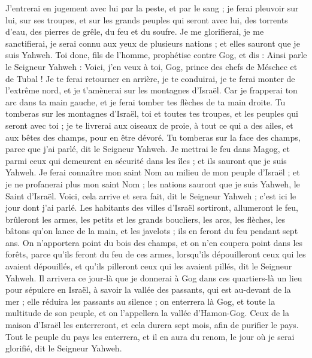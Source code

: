 \begin{multicols}{2}
J'entrerai en jugement avec lui par la peste, et par le sang ; je ferai pleuvoir sur lui, sur ses troupes, et sur les grands peuples qui seront avec lui, des torrents d'eau, des pierres de grêle, du feu et du soufre.
Je me glorifierai, je me sanctifierai, je serai connu aux yeux de plusieurs nations ; et elles sauront que je suis Yahweh.
\VerseOne{}Toi donc, fils de l’homme, prophétise contre Gog, et dis : Ainsi parle le Seigneur Yahweh : Voici, j'en veux à toi, Gog, prince des chefs de Méschec et de Tubal !
Je te ferai retourner en arrière, je te conduirai, je te ferai monter de l’extrême nord, et je t’amènerai sur les montagnes d’Israël.
Car je frapperai ton arc dans ta main gauche, et je ferai tomber tes flèches de ta main droite.
Tu tomberas sur les montagnes d'Israël, toi et toutes tes troupes, et les peuples qui seront avec toi ; je te livrerai aux oiseaux de proie, à tout ce qui a des ailes, et aux bêtes des champs, pour en être dévoré.
Tu tomberas sur la face des champs, parce que j'ai parlé, dit le Seigneur Yahweh.
Je mettrai le feu dans Magog, et parmi ceux qui demeurent en sécurité dans les îles ; et ils sauront que je suis Yahweh.
Je ferai connaître mon saint Nom au milieu de mon peuple d'Israël ; et je ne profanerai plus mon saint Nom ; les nations sauront que je suis Yahweh, le Saint d’Israël.
Voici, cela arrive et  sera  fait, dit le Seigneur Yahweh ; c'est ici le jour dont j'ai parlé.
Les habitants des villes d'Israël sortiront, allumeront le feu, brûleront les armes, les petits et les grands boucliers, les arcs, les flèches, les bâtons qu'on lance de la main, et les javelots ; ils en feront du feu pendant sept ans.
On n'apportera point du bois des champs, et on n'en coupera point dans les forêts, parce qu'ils feront du feu de ces armes, lorsqu'ils dépouilleront ceux qui les avaient dépouillés, et qu'ils pilleront ceux qui les avaient pillés, dit le Seigneur Yahweh.
Il arrivera ce jour-là que je donnerai à Gog dans ces quartiers-là un lieu pour sépulcre en Israël, à savoir la vallée des passants, qui est au-devant de la mer ; elle réduira les passants au silence ; on enterrera là Gog, et toute la multitude de son peuple, et on l'appellera la vallée d'Hamon-Gog.
Ceux de la maison d'Israël les enterreront, et cela durera sept mois, afin de purifier le pays.
Tout le peuple du pays les enterrera, et il en aura du renom, le jour où je serai glorifié, dit le Seigneur Yahweh.

\end{multicols}
